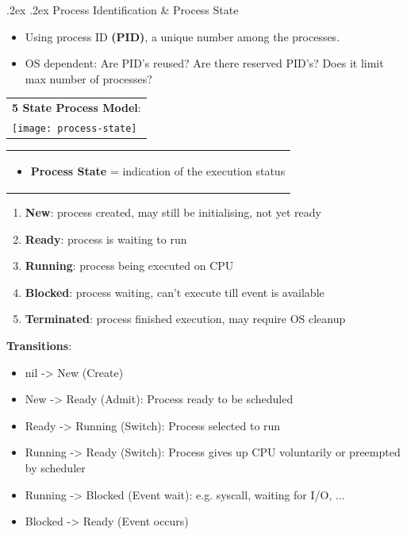 \documentclass[10pt,landscape,a4paper]{article}
\makeatletter
\renewcommand{\subsection}{\@startsection{subsection}{1}{0mm}%
  {.2ex}%
  {.2ex}%
{\sffamily\bfseries}}
\makeatother
\begin{document}
\begin{multicols*}{4}
  \subsection{Process Identification \& Process State}
  \begin{itemize}
    \item Using process ID \textbf{(PID)}, a unique number among the processes.
    \item OS dependent: Are PID's reused? Are there reserved PID's? Does it limit max number of processes?
  \end{itemize}
  \begin{tabular}{l}
    \textbf{5 State Process Model}:\\
    \texttt{[image: process-state]}
  \end{tabular}
  \begin{tabularx}{0.4\columnwidth}{X}
  \begin{itemize}
    \item \textbf{Process State} = indication of the execution status
  \end{itemize}
  \end{tabularx}
  \begin{enumerate}
    \item \textbf{New}: process created, may still be initialising, not yet ready
    \item \textbf{Ready}: process is waiting to run
    \item \textbf{Running}: process being executed on CPU
    \item \textbf{Blocked}: process waiting, can't execute till event is available
    \item \textbf{Terminated}: process finished execution, may require OS cleanup
  \end{enumerate}
  \textbf{Transitions}:
  \begin{itemize}
    \item nil -> New (Create)
    \item New -> Ready (Admit): Process ready to be scheduled
    \item Ready -> Running (Switch): Process selected to run
    \item Running -> Ready (Switch): Process gives up CPU voluntarily or preempted by scheduler
    \item Running -> Blocked (Event wait): e.g. syscall, waiting for I/O, ...
    \item Blocked -> Ready (Event occurs)
  \end{itemize}

\end{multicols*}
\end{document}
